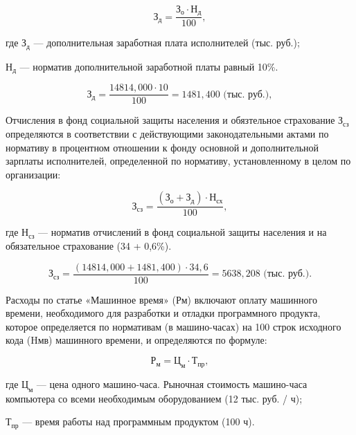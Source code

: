 \begin{displaymath}
  \text{З}_{\text{д}} = \frac{ \text{З}_{\text{о}} \cdot \text{Н}_{\text{д}} } { 100 },
\end{displaymath}

где \(\text{З}_{\text{д}}\) --- дополнительная заработная плата исполнителей (тыс. руб.);
 
\(\text{Н}_{\text{д}}\) --- норматив дополнительной заработной платы равный 10\%.

\begin{displaymath}
  \text{З}_{\text{д}} = \frac{ 14814,000 \cdot 10 } { 100 } = 1481,400 \text{ (тыс. руб.)},
\end{displaymath}

Отчисления в фонд социальной защиты населения и обязтельное страхование \( \text{З}_{\text{сз}} \) определяются в соответствии с действующими законодательными актами по нормативу в процентном отношении к фонду основной и дополнительной зарплаты исполнителей, определенной по нормативу, установленному в целом по организации:

\begin{displaymath}
  \text{З}_{\text{сз}} = \frac{ (\text{З}_{\text{о}} + \text{З}_{\text{д}}) \cdot \text{Н}_{\text{сх}}  } { 100},
\end{displaymath}

где \(\text{Н}_{\text{сз}}\) --- норматив отчислений в фонд социальной защиты населения  и на обязательное страхование (34 + 0,6\%).

\begin{displaymath}
  \text{З}_{\text{сз}} = \frac{ (14814,000 + 1481,400) \cdot 34,6  } { 100 } = 5638,208 \text{ (тыс. руб.)}.
\end{displaymath}

Расходы по статье «Машинное время» (Рм) включают оплату машинного времени, необходимого для разработки и отладки программного продукта, которое определяется по нормативам (в машино-часах) на 100 строк исходного кода (Hмв) машинного времени, и определяются по формуле:

\begin{displaymath}
  \text{Р}_{\text{м}} = \text{Ц}_{\text{м}} \cdot \text{Т}_{\text{пр}},
\end{displaymath}

где \(\text{Ц}_{\text{м}}\) --- цена одного машино-часа. Рыночная стоимость машино-часа компьютера со всеми необходимым оборудованием (12 тыс. руб. / ч);

\(\text{Т}_{\text{пр}}\) --- время работы над программным продуктом (100 ч).

